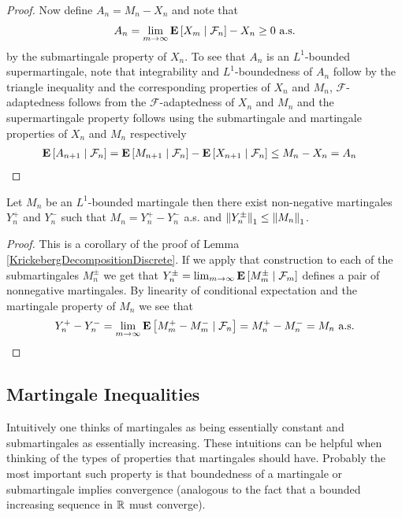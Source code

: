 \begin{proof}
Now define $A_n = M_n - X_n$ and note that 
\begin{align*}
A_n = \lim_{m \to \infty} \cexpectationlong{\mathcal{F}_n}{X_m} - X_n \geq
0 \text{ a.s.}
\end{align*}
by the submartingale property of $X_n$.  To see that $A_n$ is an $L^1$-bounded
supermartingale, note that integrability and $L^1$-boundedness of $A_n$ follow by the
triangle inequality and the corresponding properties of $X_n$ and $M_n$, $\mathcal{F}$-adaptedness follows from the
$\mathcal{F}$-adaptedness of $X_n$ and $M_n$ and the supermartingale
property follows using the submartingale and martingale properties of
$X_n$ and $M_n$ respectively
\begin{align*}
\cexpectationlong{\mathcal{F}_n}{A_{n+1}} &=
\cexpectationlong{\mathcal{F}_n}{M_{n+1}} -
\cexpectationlong{\mathcal{F}_n}{X_{n+1}} \leq M_n - X_n = A_n
\end{align*}
\end{proof}

\begin{lem}Let $M_n$ be an $L^1$-bounded martingale then there exist
  non-negative martingales $Y_n^+$ and $Y_n^-$ such that $M_n = Y_n^+
  - Y_n^-$ a.s. and $\norm{Y_n^\pm}_1 \leq \norm{M_n}_1$.
\end{lem}
\begin{proof}
This is a corollary of the proof of Lemma
\ref{KrickebergDecompositionDiscrete}.  If we apply that construction
to each of the submartingales $M_n^\pm$ we get that $Y_n^\pm = \lim_{m
  \to \infty} \cexpectationlong{\mathcal{F}_m}{M_m^\pm}$ defines a
pair of nonnegative martingales.  By linearity of conditional
expectation and the martingale property of $M_n$ we see that
\begin{align*}
Y_n^+ - Y_n^- = \lim_{m \to \infty}
\cexpectationlong{\mathcal{F}_n}{M_m^+ - M_m^-} = M_n^+ - M_n^- = M_n
\text{ a.s.}
\end{align*}
\end{proof}

\subsection{Martingale Inequalities}
Intuitively one thinks of martingales as being essentially constant
and submartingales as essentially increasing.  These intuitions can be
helpful when thinking of the types of properties that martingales
should have.  Probably the most important such property is that
boundedness of  a martingale or submartingale implies convergence (analogous
to the fact that a bounded increasing sequence in $\reals$ must converge).  

